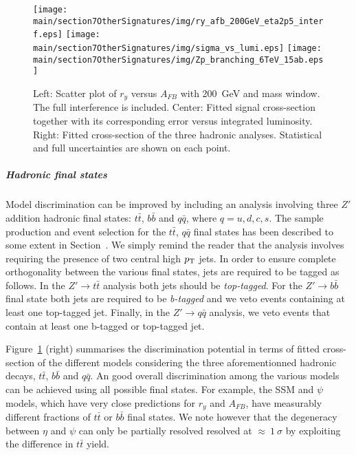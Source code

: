 \begin{figure}[!htb]
  \centering
   \texttt{[image: \\main/section7OtherSignatures/img/ry\_afb\_200GeV\_eta2p5\_interf.eps]}
   \texttt{[image: \\main/section7OtherSignatures/img/sigma\_vs\_lumi.eps]}
   \texttt{[image: \\main/section7OtherSignatures/img/Zp\_branching\_6TeV\_15ab.eps]}
  \caption{Left: Scatter plot of $r_y$ versus $A_{FB}$ with 200~GeV and mass window. The full interference is included. Center: Fitted signal cross-section together with its corresponding error versus integrated luminosity. Right: Fitted cross-section of the three hadronic analyses. Statistical and full uncertainties are shown on each point.}
  \label{fig:ana:res}
\end{figure}

\subparagraph*{Hadronic final states}
\label{par:hadana}

Model discrimination can be improved by including an analysis involving three $Z'$ addition hadronic final states: $t\bar{t}$, $b\bar{b}$ and $q\bar{q}$, where $q=u,d,c,s$. The sample production and event selection for the $t\bar{t}$, $q\bar{q}$ final states has been described to some extent in Section~\cite{subsubsec:hr_had}. We simply remind the reader that the analysis involves requiring the presence of two central high $p_\text{T}$ jets. In order to ensure complete orthogonality between the various final states, jets are required to be tagged as follows. In the $Z' \rightarrow t\bar{t}$ analysis both jets should be \emph{top-tagged}. For the $Z' \rightarrow b\bar{b}$ final state both jets are required to be \emph{b-tagged} and we veto events containing at least one top-tagged jet. Finally, in the $Z' \rightarrow q\bar{q}$ analysis, we veto events that contain at least one b-tagged or top-tagged jet.

Figure~\ref{fig:ana:res} (right) summarises the discrimination potential in terms of fitted cross-section of the different models considering the three aforementionned hadronic decays, $t\bar{t}$,  $b\bar{b}$ and $q\bar{q}$. An good overall discrimination among the various models can be achieved using all possible final states. For example, the SSM and $\psi$ models, which have very close predictions for $r_y$ and $A_{FB}$, have measurably different fractions of $t\bar{t}$ or $b\bar{b}$ final states. We note however that the degeneracy between $\eta$ and $\psi$ can only be partially resolved resolved at $\approx~1~\sigma$ by exploiting the difference in $t\bar{t}$ yield.

